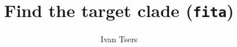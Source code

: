 

\pagestyle{noweb}
\title{Find the target clade (\texttt{fita})}
\author{Ivan Tsers}
\maketitle




